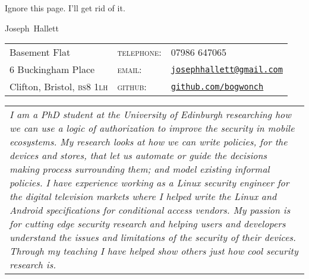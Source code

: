 \documentclass[a4paper,10pt,selectp]{book}
\newcommand{\lowercaps}[1]{\textsc{\MakeLowercase{#1}}}
\newcommand{\heading}[1]{{{\color{BrickRed}\hspace{1em}\Huge #1}\vspace{0.5em}}}
\newcommand{\email}[1]{\href{mailto:#1}{#1}}
\newcommand{\postcode}[1]{\lowercaps{#1}}
\begin{document}
Ignore this page.  I'll get rid of it.
\newpage

\heading{Joseph~Hallett}

\begin{tabular}{l@{\hspace{12em}} l@{\hspace{1em}} l}
  Basement Flat & \textsc{telephone:} & 07986 647065 \\
  6 Buckingham Place & \textsc{email:} & \email{\tt josephhallett@gmail.com} \\
  Clifton, Bristol, \postcode{bs8 1lh} & \textsc{github:} & \href{https://www.github.com/bogwonch}{\tt github.com/bogwonch} \\
\end{tabular}

\vspace{1em} \begin{tabular}{p{\textwidth}}\itshape I am a PhD student at the
               University of Edinburgh researching how we can use a logic of authorization to
               improve the security in mobile ecosystems.  My research looks at how we can
               write policies, for the devices and stores, that let us automate or
               guide the decisions making process surrounding them; and model existing
               informal policies.  I have experience working as a Linux
               security engineer for the digital television markets where I helped write the
               Linux and Android specifications for conditional access vendors.  My passion
               is for cutting edge security research and helping users and developers
               understand the issues and limitations of the security of their devices.
               Through my teaching I have helped show others just how cool security research
               is.  \end{tabular} \vspace{0.3em}
\end{document}

